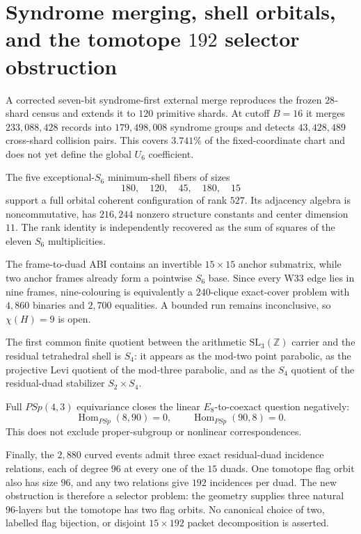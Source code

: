 \section*{Syndrome merging, shell orbitals, and the tomotope $192$ selector obstruction}

A corrected seven-bit syndrome-first external merge reproduces the frozen $28$-shard census and extends it to $120$ primitive shards. At cutoff $B=16$ it merges $233{,}088{,}428$ records into $179{,}498{,}008$ syndrome groups and detects $43{,}428{,}489$ cross-shard collision pairs. This covers $3.741\%$ of the fixed-coordinate chart and does not yet define the global $U_6$ coefficient.

The five exceptional-$S_6$ minimum-shell fibers of sizes
\[
180,\quad120,\quad45,\quad180,\quad15
\]
support a full orbital coherent configuration of rank $527$. Its adjacency algebra is noncommutative, has $216{,}244$ nonzero structure constants and center dimension $11$. The rank identity is independently recovered as the sum of squares of the eleven $S_6$ multiplicities.

The frame-to-duad ABI contains an invertible $15\times15$ anchor submatrix, while two anchor frames already form a pointwise $S_6$ base. Since every W33 edge lies in nine frames, nine-colouring is equivalently a $240$-clique exact-cover problem with $4{,}860$ binaries and $2{,}700$ equalities. A bounded run remains inconclusive, so $\chi(H)=9$ is open.

The first common finite quotient between the arithmetic $\mathrm{SL}_3(\mathbb Z)$ carrier and the residual tetrahedral shell is $S_4$: it appears as the mod-two point parabolic, as the projective Levi quotient of the mod-three parabolic, and as the $S_4$ quotient of the residual-duad stabilizer $S_2\times S_4$.

Full $PSp(4,3)$ equivariance closes the linear $E_8$-to-coexact question negatively:
\[
\operatorname{Hom}_{PSp}(8,90)=0,
\qquad
\operatorname{Hom}_{PSp}(90,8)=0.
\]
This does not exclude proper-subgroup or nonlinear correspondences.

Finally, the $2{,}880$ curved events admit three exact residual-duad incidence relations, each of degree $96$ at every one of the $15$ duads. One tomotope flag orbit also has size $96$, and any two relations give $192$ incidences per duad. The new obstruction is therefore a selector problem: the geometry supplies three natural $96$-layers but the tomotope has two flag orbits. No canonical choice of two, labelled flag bijection, or disjoint $15\times192$ packet decomposition is asserted.
